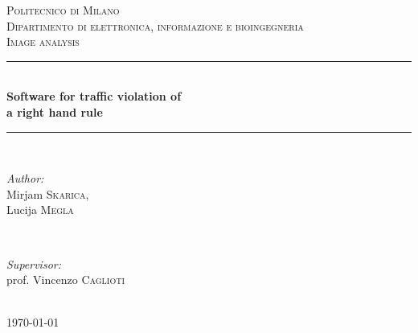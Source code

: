 \documentclass[12pt]{article} %
\begin{document}

\begin{titlepage}

\newcommand{\HRule}{\rule{\linewidth}{0.5mm}} %

\center %

\textsc{\LARGE Politecnico di Milano}\\[1.5cm] %
\textsc{\Large Dipartimento di elettronica, informazione e bioingegneria}\\[0.5cm] %
\textsc{\large Image analysis}\\[0.5cm] %

\HRule \\[0.4cm]
{ \huge \textbf{ Software for traffic violation of 
\\ a right hand rule}}\\[0.4cm] %
\HRule \\[1.5cm]

\begin{minipage}{0.4\textwidth}
\begin{flushleft} \large
\emph{Author:}\\
Mirjam \textsc{Skarica},\\ 
Lucija \textsc{Megla} %
\end{flushleft}
\end{minipage}
~
\begin{minipage}{0.4\textwidth}
\begin{flushright} \large
\emph{Supervisor:} \\
prof. Vincenzo \textsc{Caglioti} %
\end{flushright}
\end{minipage}\\[4cm]

{\large \today}\\[3cm] %


\vfill %

\end{titlepage}
\end{document}
